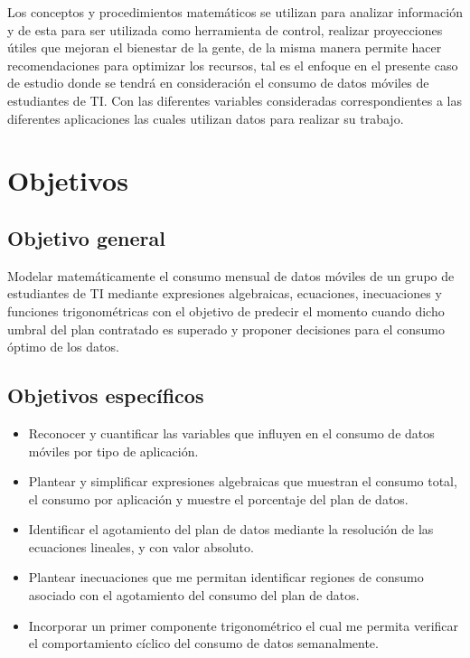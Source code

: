 \documentclass[12pt,a4paper]{article}
\begin{document}
\begin{center}
		Los conceptos y procedimientos matemáticos se utilizan para analizar información y de esta para ser utilizada como herramienta de control, realizar proyecciones útiles que mejoran el bienestar de la gente, de la misma manera permite hacer recomendaciones para optimizar los recursos, tal es el enfoque en el presente caso de estudio donde se tendrá en consideración el consumo de datos móviles de estudiantes de TI. Con las diferentes variables consideradas correspondientes a las diferentes aplicaciones las cuales utilizan datos para realizar su trabajo.
		
		\section{Objetivos}
		
		\subsection{Objetivo general}
		
		Modelar matemáticamente el consumo mensual de datos móviles de un grupo de estudiantes de TI mediante expresiones algebraicas, ecuaciones, inecuaciones y funciones trigonométricas con el objetivo de predecir el momento cuando dicho  umbral del plan contratado es superado y proponer decisiones para el consumo óptimo de los datos.
		
		\subsection{Objetivos específicos}
		
		\begin{itemize}
			\item Reconocer y cuantificar las variables que influyen en el consumo de datos móviles por tipo de aplicación.
			\item Plantear y simplificar expresiones algebraicas que muestran el consumo total, el consumo por aplicación y muestre el porcentaje del plan de datos.
			\item Identificar el agotamiento del plan de datos mediante la resolución de las ecuaciones lineales, y con valor absoluto.
			\item Plantear inecuaciones que me permitan identificar regiones de consumo asociado con el agotamiento del consumo del plan de datos.
			\item Incorporar un primer componente trigonométrico el cual me permita verificar el comportamiento cíclico del consumo de datos semanalmente.
			

\end{itemize}
\end{center}
\end{document}
